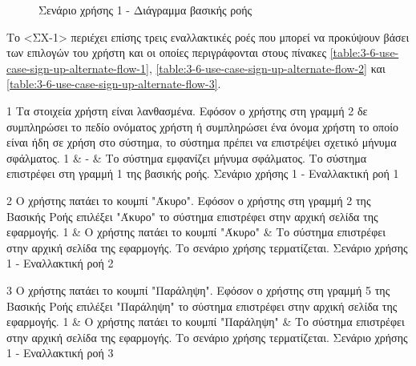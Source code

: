 \begin{figure}[H]
    \centering
    
    \caption{Σενάριο χρήσης 1 - Διάγραμμα βασικής ροής}
    \label{figure:3-6-use-case-sign-up-base-flow-sequence-diagram}
\end{figure}


Το <ΣΧ-1> περιέχει επίσης τρεις εναλλακτικές ροές που μπορεί να προκύψουν βάσει των επιλογών του χρήστη και οι οποίες περιγράφονται στους πίνακες \ref{table:3-6-use-case-sign-up-alternate-flow-1}, \ref{table:3-6-use-case-sign-up-alternate-flow-2} και \ref{table:3-6-use-case-sign-up-alternate-flow-3}.

\useCaseAlternateFlowTable
{1}
{Τα στοιχεία χρήστη είναι λανθασμένα.}
{Εφόσον ο χρήστης στη γραμμή 2 δε συμπληρώσει το πεδίο ονόματος χρήστη ή συμπληρώσει ένα όνομα χρήστη το οποίο είναι ήδη σε χρήση στο σύστημα, το σύστημα πρέπει να επιστρέψει σχετικό μήνυμα σφάλματος.}
{
    1 & - & Το σύστημα εμφανίζει μήνυμα σφάλματος.
}
{Το σύστημα επιστρέφει στη γραμμή 1 της βασικής ροής.}
{Σενάριο χρήσης 1 - Εναλλακτική ροή 1}
{\label{table:3-6-use-case-sign-up-alternate-flow-1}}

\useCaseAlternateFlowTable
{2}
{Ο χρήστης πατάει το κουμπί "Άκυρο".}
{Εφόσον ο χρήστης στη γραμμή 2 της Βασικής Ροής επιλέξει "Άκυρο" το σύστημα επιστρέφει στην αρχική σελίδα της εφαρμογής.}
{
    1 & Ο χρήστης πατάει το κουμπί "Άκυρο" & Το σύστημα επιστρέφει στην αρχική σελίδα της εφαρμογής.
}
{Το σενάριο χρήσης τερματίζεται.}
{Σενάριο χρήσης 1 - Εναλλακτική ροή 2}
{\label{table:3-6-use-case-sign-up-alternate-flow-2}}

\useCaseAlternateFlowTable
{3}
{Ο χρήστης πατάει το κουμπί "Παράληψη".}
{Εφόσον ο χρήστης στη γραμμή 5 της Βασικής Ροής επιλέξει "Παράληψη" το σύστημα επιστρέφει στην αρχική σελίδα της εφαρμογής.}
{
    1 & Ο χρήστης πατάει το κουμπί "Παράληψη" & Το σύστημα επιστρέφει στην αρχική σελίδα της εφαρμογής.
}
{Το σενάριο χρήσης τερματίζεται.}
{Σενάριο χρήσης 1 - Εναλλακτική ροή 3}
{\label{table:3-6-use-case-sign-up-alternate-flow-3}}
